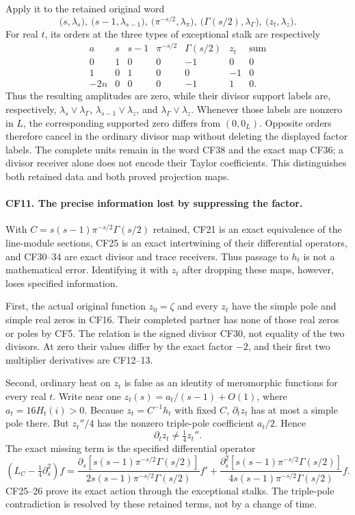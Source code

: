 Apply it to the retained original word
\[
 \bigl(s,\lambda_s\bigr),\
 \bigl(s-1,\lambda_{s-1}\bigr),\
 \bigl(\pi^{-s/2},\lambda_\pi\bigr),\
 \bigl(\Gamma(s/2),\lambda_\Gamma\bigr),\
 \bigl(z_t,\lambda_z\bigr).
 \tag{CF38}
\]
For real \(t\), its orders at the three types of
exceptional stalk are respectively
\[
 \begin{array}{c|ccccc|c}
 a&s&s-1&\pi^{-s/2}&\Gamma(s/2)&z_t&
       \text{sum}\\ \hline
 0&1&0&0&-1&0&0\\
 1&0&1&0&0&-1&0\\
 -2n&0&0&0&-1&1&0 .
 \end{array}\tag{CF39}
\]
Thus the resulting amplitudes are zero, while their
divisor support labels are, respectively,
\(\lambda_s\vee\lambda_\Gamma\),
\(\lambda_{s-1}\vee\lambda_z\), and
\(\lambda_\Gamma\vee\lambda_z\).
Whenever those labels are nonzero in \(L\), the
corresponding supported zero differs from
\((0,0_L)\). Opposite orders therefore cancel in the
ordinary divisor map without deleting the displayed
factor labels. The complete units remain in the word
CF38 and the exact map CF36; a divisor receiver
alone does not encode their Taylor coefficients.
This distinguishes both retained data and both
proved projection maps.

\paragraph{CF11. The precise information lost by suppressing the factor.}
With \(C=s(s-1)\pi^{-s/2}\Gamma(s/2)\) retained, CF21
is an exact equivalence of the line-module sections,
CF25 is an exact intertwining of their differential
operators, and CF30--34 are exact divisor and trace
receivers. Thus passage to \(h_t\) is not a mathematical
error. Identifying it with \(z_t\) after dropping these
maps, however, loses specified information.

First, the actual original function \(z_0=\zeta\) and
every \(z_t\) have the simple pole and simple real
zeros in CF16. Their completed partner has none of
those real zeros or poles by CF5. The relation is the
signed divisor CF30, not equality of the two divisors.
At zero their values differ by the exact factor
\(-2\), and their first two multiplier derivatives
are CF12--13.

Second, ordinary heat on \(z_t\) is false as an identity
of meromorphic functions for every real \(t\).
Write near one \(z_t(s)=a_t/(s-1)+O(1)\), where
\(a_t=16H_t(i)>0\).
Because \(z_t=C^{-1}h_t\) with fixed \(C\),
\(\partial_t z_t\) has at most a simple pole there.
But \(z_t''/4\) has the nonzero triple-pole coefficient
\(a_t/2\). Hence
\[
 \partial_tz_t\ne\tfrac14z_t'' .
 \tag{CF40}
\]
The exact missing term is the specified differential
operator
\[
 (L_C-\tfrac14\partial_s^2)f
 =\frac{\partial_s[s(s-1)\pi^{-s/2}\Gamma(s/2)]}
        {2s(s-1)\pi^{-s/2}\Gamma(s/2)}f'
 +\frac{\partial_s^2[s(s-1)\pi^{-s/2}\Gamma(s/2)]}
        {4s(s-1)\pi^{-s/2}\Gamma(s/2)}f .
 \tag{CF41}
\]
CF25--26 prove its exact action through the exceptional
stalks. The triple-pole contradiction is resolved
by these retained terms, not by a change of time.

